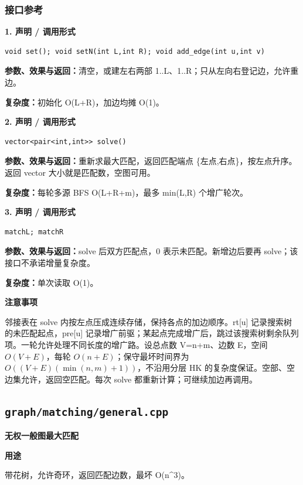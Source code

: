 \documentclass[UTF8,a4paper,10pt]{ctexart}
\newcommand{\TemplUsage}[1]{\textbf{用途}\par #1\par}
\newcommand{\TemplNote}[1]{\textbf{注意事项}\par #1\par}
\begin{document}
\subsubsection*{接口参考}
\noindent\begin{minipage}{\textwidth}
\textbf{1. 声明 / 调用形式}
\begin{lstlisting}
void set(); void setN(int L,int R); void add_edge(int u,int v)
\end{lstlisting}
\textbf{参数、效果与返回：}清空，或建左右两部 1..L、1..R；只从左向右登记边，允许重边。

\textbf{复杂度：}初始化 O(L+R)，加边均摊 O(1)。

\end{minipage}\par\vspace{0.4em}
\noindent\begin{minipage}{\textwidth}
\textbf{2. 声明 / 调用形式}
\begin{lstlisting}
vector<pair<int,int>> solve()
\end{lstlisting}
\textbf{参数、效果与返回：}重新求最大匹配，返回匹配端点 \{左点,右点\}，按左点升序。返回 vector 大小就是匹配数，空图可用。

\textbf{复杂度：}每轮多源 BFS O(L+R+m)，最多 min(L,R) 个增广轮次。

\end{minipage}\par\vspace{0.4em}
\noindent\begin{minipage}{\textwidth}
\textbf{3. 声明 / 调用形式}
\begin{lstlisting}
matchL; matchR
\end{lstlisting}
\textbf{参数、效果与返回：}solve 后双方匹配点，0 表示未匹配。新增边后要再 solve；该接口不承诺增量复杂度。

\textbf{复杂度：}单次读取 O(1)。

\TemplNote{邻接表在 solve 内按左点压成连续存储，保持各点的加边顺序。rt[u] 记录搜索树的未匹配起点，pre[u] 记录增广前驱；某起点完成增广后，跳过该搜索树剩余队列项。一轮允许处理不同长度的增广路。设总点数 V=n+m、边数 E，空间 $O(V+E)$，每轮 $O(n+E)$；保守最坏时间界为 $O((V+E)(\min(n,m)+1))$，不沿用分层 HK 的复杂度保证。空部、空边集允许，返回空匹配。每次 solve 都重新计算；可继续加边再调用。}
\end{minipage}\par\vspace{0.4em}
\clearpage
\subsection{\texttt{graph/matching/general.cpp}}
\textbf{无权一般图最大匹配}\par
\TemplUsage{带花树，允许奇环，返回匹配边数，最坏 O(n\textasciicircum{}3)。}
\end{document}
